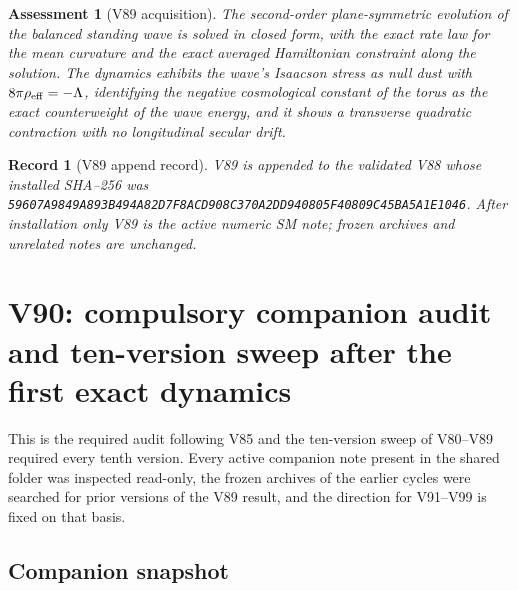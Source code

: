 \documentclass[11pt]{article}
\newtheorem{assessment}[theorem]{Assessment}
\newtheorem{record}[theorem]{Record}
\theoremstyle{remark}
\begin{document}
\begin{assessment}[V89 acquisition]
\label{ass:v19v89}
The second-order plane-symmetric evolution of the balanced standing
wave is solved in closed form, with the exact rate law for the mean
curvature and the exact averaged Hamiltonian constraint along the
solution.  The dynamics exhibits the wave's Isaacson stress as null
dust with \(8\pi\rho_{\rm eff}=-\Lambda\), identifying the negative
cosmological constant of the torus as the exact counterweight of the
wave energy, and it shows a transverse quadratic contraction with no
longitudinal secular drift.
\end{assessment}

\begin{record}[V89 append record]
\label{rec:v19v89}
V89 is appended to the validated V88 whose installed SHA--256 was
\texttt{59607A9849A893B494A82D7F8ACD908C370A2DD940805F40809C45BA5A1E1046}.
After installation only V89 is the active numeric SM note; frozen
archives and unrelated notes are unchanged.
\end{record}


\section{V90: compulsory companion audit and ten-version sweep after the first exact dynamics}
\label{sec:v19v90}

This is the required audit following V85 and the ten-version sweep
of V80--V89 required every tenth version.  Every active companion
note present in the shared folder was inspected read-only, the
frozen archives of the earlier cycles were searched for prior
versions of the V89 result, and the direction for V91--V99 is fixed
on that basis.

\subsection{Companion snapshot}
\end{document}
